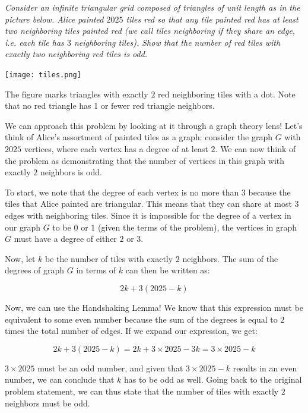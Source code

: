 \documentclass{article}
\begin{document}
\begin{multicols}{2}
\begin{center}
    \textit{Consider an infinite triangular grid composed of triangles of unit length as in the picture below. Alice painted $2025$ tiles red so that any tile painted red has at least two neighboring tiles painted red (we call tiles neighboring if they share an edge, i.e. each tile has $3$ neighboring tiles). Show that the number of red tiles with exactly two neighboring red tiles is odd.}

     \texttt{[image: tiles.png]}

     The figure marks triangles with exactly $2$ red neighboring tiles with a dot. Note that no red triangle has 1 or fewer red triangle neighbors. 

\end{center}

We can approach this problem by looking at it through a graph theory lens! Let's think of Alice's assortment of painted tiles as a graph: consider the graph $G$ with $2025$ vertices, where each vertex has a degree of at least $2$. We can now think of the problem as demonstrating that the number of vertices in this graph with exactly $2$ neighbors is odd. 

To start, we note that the degree of each vertex is no more than $3$ because the tiles that Alice painted are triangular. This means that they can share at most $3$ edges with neighboring tiles. Since it is impossible for the degree of a vertex in our graph $G$ to be $0$ or $1$ (given the terms of the problem), the vertices in graph $G$ must have a degree of either $2$ or $3$. 

Now, let $k$ be the number of tiles with exactly $2$ neighbors. The sum of the degrees of graph $G$ in terms of $k$ can then be written as:

\begin{equation*}
    2k+3(2025-k)
\end{equation*}

Now, we can use the Handshaking Lemma! We know that this expression must be equivalent to some even number because the sum of the degrees is equal to $2$ times the total number of edges. If we expand our expression, we get:

\begin{equation*}
    2k+3(2025-k)=2k+3\times2025-3k=3\times2025-k
\end{equation*}

$3\times2025$ must be an odd number, and given that $3\times2025-k$ results in an even number, we can conclude that $k$ has to be odd as well. Going back to the original problem statement, we can thus state that the number of tiles with exactly $2$ neighbors must be odd. 
\medbreak


\end{multicols}
\end{document}
